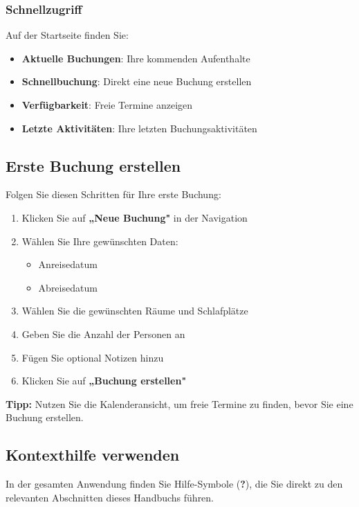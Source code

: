 \subsubsection{Schnellzugriff}

Auf der Startseite finden Sie:

\begin{itemize}
    \item \textbf{Aktuelle Buchungen}: Ihre kommenden Aufenthalte
    \item \textbf{Schnellbuchung}: Direkt eine neue Buchung erstellen
    \item \textbf{Verfügbarkeit}: Freie Termine anzeigen
    \item \textbf{Letzte Aktivitäten}: Ihre letzten Buchungsaktivitäten
\end{itemize}

\subsection{Erste Buchung erstellen}

Folgen Sie diesen Schritten für Ihre erste Buchung:

\begin{enumerate}
    \item Klicken Sie auf \textbf{„Neue Buchung"} in der Navigation
    \item Wählen Sie Ihre gewünschten Daten:
        \begin{itemize}
            \item Anreisedatum
            \item Abreisedatum
        \end{itemize}
    \item Wählen Sie die gewünschten Räume und Schlafplätze
    \item Geben Sie die Anzahl der Personen an
    \item Fügen Sie optional Notizen hinzu
    \item Klicken Sie auf \textbf{„Buchung erstellen"}
\end{enumerate}

\textbf{Tipp:} Nutzen Sie die Kalenderansicht, um freie Termine zu finden, bevor Sie eine Buchung erstellen.

\subsection{Kontexthilfe verwenden}

In der gesamten Anwendung finden Sie Hilfe-Symbole (\textbf{?}), die Sie direkt zu den relevanten Abschnitten dieses Handbuchs führen.

\newpage